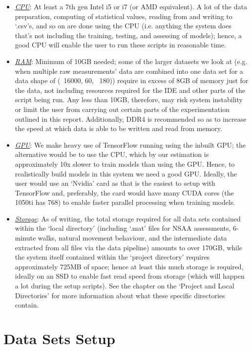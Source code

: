 \documentclass[12pt,twoside]{report}
\begin{document}
\begin{itemize}
	\item \underline{\textit{CPU}}: At least a 7th gen Intel i5 or i7 (or AMD equivalent). A lot of the data preparation, computing of statistical values, reading from and writing to ‘.csv’s, and so on are done using the CPU (i.e. anything the system does that’s not including the training, testing, and assessing of models); hence, a good CPU will enable the user to run these scripts in reasonable time.
	\item \underline{\textit{RAM}}: Minimum of 10GB needed; some of the larger datasets we look at (e.g. when multiple raw measurements’ data are combined into one data set for a data shape of (~16000, 60, ~180)) require in excess of 8GB of memory just for the data, not including resources required for the IDE and other parts of the script being run. Any less than 10GB, therefore, may risk system instability or limit the user from carrying out certain parts of the experimentation outlined in this report. Additionally, DDR4 is recommended so as to increase the speed at which data is able to be written and read from memory.
	\item \underline{\textit{GPU}}: We make heavy use of TensorFlow running using the inbuilt GPU; the alternative would be to use the CPU, which by our estimation is approximately 10x slower to train models than using the GPU. Hence, to realistically build models in this system we need a good GPU. Ideally, the user would use an ‘Nvidia’ card as that is the easiest to setup with TensorFlow and, preferably, the card would have many CUDA cores (the 1050ti has 768) to enable faster parallel processing when training models.
	\item \underline{\textit{Storage}}: As of writing, the total storage required for all data sets contained within the ‘local directory’ (including ‘.mat’ files for NSAA assessments, 6-minute walks, natural movement behaviour, and the intermediate data extracted from all files via the data pipeline) amounts to over 170GB, while the system itself contained within the ‘project directory’ requires approximately 725MB of space; hence at least this much storage is required, ideally on an SSD to enable fast read speed from storage (which will happen a lot during the setup scripts). See the chapter on the ‘Project and Local Directories’ for more information about what these specific directories contain.
\end{itemize}


\section{Data Sets Setup}
\end{document}
